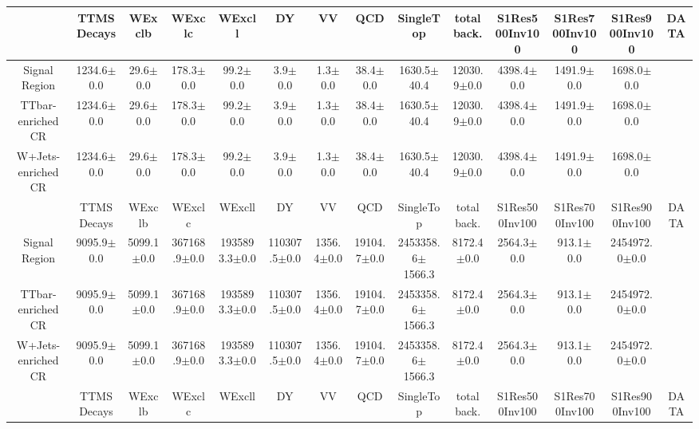 \documentclass[10pt]{article}
\begin{document}
\begin{table}[p]
\begin{tabular}{|c|c|c|c|c|c|c|c|c|c|c|c|c|c|}
\hline
\hline
      & TTMSDecays  & WExclb  & WExclc  & WExcll  & DY  & VV  & QCD  & SingleTop  & total back. & S1Res500Inv100  & S1Res700Inv100  & S1Res900Inv100  & DATA  \\ 
\hline 
\hline 
Signal Region & 1234.6$\pm$0.0 & 29.6$\pm$0.0 & 178.3$\pm$0.0 & 99.2$\pm$0.0 & 3.9$\pm$0.0 & 1.3$\pm$0.0 & 38.4$\pm$0.0 & 1630.5$\pm$40.4 & 12030.9$\pm$0.0 & 4398.4$\pm$0.0 & 1491.9$\pm$0.0 & 1698.0$\pm$0.0 & \\ 
\hline 
\hline 
TTbar-enriched CR & 1234.6$\pm$0.0 & 29.6$\pm$0.0 & 178.3$\pm$0.0 & 99.2$\pm$0.0 & 3.9$\pm$0.0 & 1.3$\pm$0.0 & 38.4$\pm$0.0 & 1630.5$\pm$40.4 & 12030.9$\pm$0.0 & 4398.4$\pm$0.0 & 1491.9$\pm$0.0 & 1698.0$\pm$0.0 & \\ 
\hline 
\hline 
W+Jets-enriched CR & 1234.6$\pm$0.0 & 29.6$\pm$0.0 & 178.3$\pm$0.0 & 99.2$\pm$0.0 & 3.9$\pm$0.0 & 1.3$\pm$0.0 & 38.4$\pm$0.0 & 1630.5$\pm$40.4 & 12030.9$\pm$0.0 & 4398.4$\pm$0.0 & 1491.9$\pm$0.0 & 1698.0$\pm$0.0 & \\ 
\hline 
\hline 
\hline 
      & TTMSDecays  & WExclb  & WExclc  & WExcll  & DY  & VV  & QCD  & SingleTop  & total back. & S1Res500Inv100  & S1Res700Inv100  & S1Res900Inv100  & DATA  \\ 
\hline 
\hline 
Signal Region & 9095.9$\pm$0.0 & 5099.1$\pm$0.0 & 367168.9$\pm$0.0 & 1935893.3$\pm$0.0 & 110307.5$\pm$0.0 & 1356.4$\pm$0.0 & 19104.7$\pm$0.0 & 2453358.6$\pm$1566.3 & 8172.4$\pm$0.0 & 2564.3$\pm$0.0 & 913.1$\pm$0.0 & 2454972.0$\pm$0.0 & \\ 
\hline 
\hline 
TTbar-enriched CR & 9095.9$\pm$0.0 & 5099.1$\pm$0.0 & 367168.9$\pm$0.0 & 1935893.3$\pm$0.0 & 110307.5$\pm$0.0 & 1356.4$\pm$0.0 & 19104.7$\pm$0.0 & 2453358.6$\pm$1566.3 & 8172.4$\pm$0.0 & 2564.3$\pm$0.0 & 913.1$\pm$0.0 & 2454972.0$\pm$0.0 & \\ 
\hline 
\hline 
W+Jets-enriched CR & 9095.9$\pm$0.0 & 5099.1$\pm$0.0 & 367168.9$\pm$0.0 & 1935893.3$\pm$0.0 & 110307.5$\pm$0.0 & 1356.4$\pm$0.0 & 19104.7$\pm$0.0 & 2453358.6$\pm$1566.3 & 8172.4$\pm$0.0 & 2564.3$\pm$0.0 & 913.1$\pm$0.0 & 2454972.0$\pm$0.0 & \\ 
\hline 
\hline 
\hline 
      & TTMSDecays  & WExclb  & WExclc  & WExcll  & DY  & VV  & QCD  & SingleTop  & total back. & S1Res500Inv100  & S1Res700Inv100  & S1Res900Inv100  & DATA  \\ 

\end{tabular}
\end{table}
\end{document}
